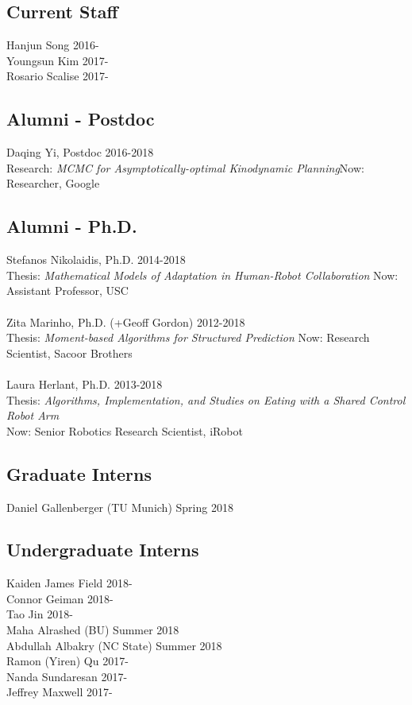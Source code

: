 \documentclass[10pt]{article}
\begin{document}
\subsection{Current Staff}
\vspace{-1em}
\noindent
Hanjun Song \hfill 2016-\\
Youngsun Kim \hfill 2017-\\
Rosario Scalise \hfill 2017-\\

\subsection{Alumni - Postdoc}
\vspace{-1em}
\noindent
Daqing Yi, Postdoc \hfill 2016-2018\\
Research: \textit{MCMC for Asymptotically-optimal Kinodynamic Planning}\hfill Now: Researcher, Google\\

\subsection{Alumni - Ph.D.}
\noindent
Stefanos Nikolaidis, Ph.D. \hfill 2014-2018\\
Thesis: \textit{Mathematical Models of Adaptation in Human-Robot Collaboration} \hfill
Now: Assistant Professor, USC\\
\\
Zita Marinho, Ph.D. (+Geoff Gordon) \hfill 2012-2018\\
Thesis: \textit{Moment-based Algorithms for Structured Prediction}\hfill
Now: Research Scientist, Sacoor Brothers\\
\\
Laura Herlant, Ph.D. \hfill 2013-2018\\
Thesis: \textit{Algorithms, Implementation, and Studies on Eating with a Shared Control Robot Arm}
\\
\phantom{a}\hfill Now: Senior Robotics Research Scientist, iRobot\\
\subsection{Graduate Interns}
\noindent
Daniel Gallenberger (TU Munich) \hfill Spring 2018\\
\subsection{Undergraduate Interns}
\noindent
Kaiden James Field \hfill 2018-\\
Connor Geiman \hfill 2018-\\
Tao Jin \hfill 2018-\\
Maha Alrashed (BU) \hfill Summer 2018\\
Abdullah Albakry (NC State) \hfill Summer 2018\\
Ramon (Yiren) Qu \hfill 2017-\\
Nanda Sundaresan \hfill 2017-\\
Jeffrey Maxwell \hfill 2017-\\
\end{document}
